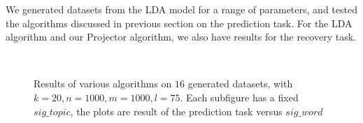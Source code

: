 We generated datasets from the LDA model for a range of parameters,
and tested the algorithms discussed in previous section on the
prediction task. For the LDA algorithm and our Projector algorithm, we
also have results for the recovery task.  


\begin{figure}
     \begin{center}

        \\ 

    \end{center}
    \caption{Results of various algorithms on $16$ generated datasets, with $k=20, n=1000,m=1000,l=75$. Each subfigure has a fixed $sig\_topic$, the plots are result of the prediction task versus $sig\_word$}
   \label{fig:predictResult}
\end{figure}

